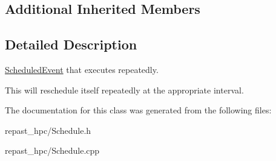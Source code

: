 \subsection*{Additional Inherited Members}


\subsection{Detailed Description}
\hyperlink{classrepast_1_1_scheduled_event}{Scheduled\-Event} that executes repeatedly. 

This will reschedule itself repeatedly at the appropriate interval. 

The documentation for this class was generated from the following files\-:\begin{DoxyCompactItemize}
\item 
repast\-\_\-hpc/Schedule.\-h\item 
repast\-\_\-hpc/Schedule.\-cpp\end{DoxyCompactItemize}
